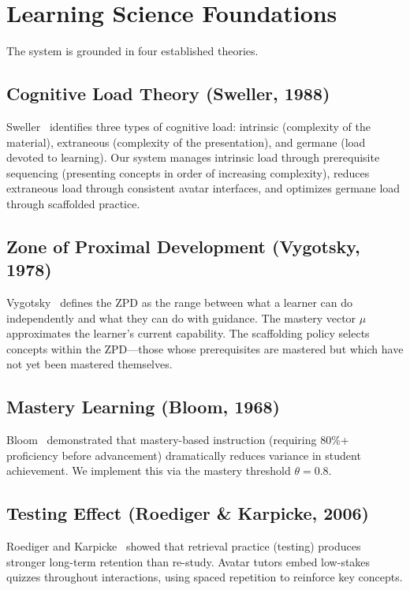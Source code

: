 \documentclass[11pt,letterpaper]{article}
\begin{document}
\section{Learning Science Foundations}

The system is grounded in four established theories.

\subsection{Cognitive Load Theory (Sweller, 1988)}

Sweller~\cite{sweller1988cognitive} identifies three types of cognitive load: intrinsic (complexity of the material), extraneous (complexity of the presentation), and germane (load devoted to learning). Our system manages intrinsic load through prerequisite sequencing (presenting concepts in order of increasing complexity), reduces extraneous load through consistent avatar interfaces, and optimizes germane load through scaffolded practice.

\subsection{Zone of Proximal Development (Vygotsky, 1978)}

Vygotsky~\cite{vygotsky1978mind} defines the ZPD as the range between what a learner can do independently and what they can do with guidance. The mastery vector $\mu$ approximates the learner's current capability. The scaffolding policy selects concepts within the ZPD---those whose prerequisites are mastered but which have not yet been mastered themselves.

\subsection{Mastery Learning (Bloom, 1968)}

Bloom~\cite{bloom1968learning} demonstrated that mastery-based instruction (requiring 80\%+ proficiency before advancement) dramatically reduces variance in student achievement. We implement this via the mastery threshold $\theta = 0.8$.

\subsection{Testing Effect (Roediger \& Karpicke, 2006)}

Roediger and Karpicke~\cite{roediger2006testing} showed that retrieval practice (testing) produces stronger long-term retention than re-study. Avatar tutors embed low-stakes quizzes throughout interactions, using spaced repetition to reinforce key concepts.
\end{document}

